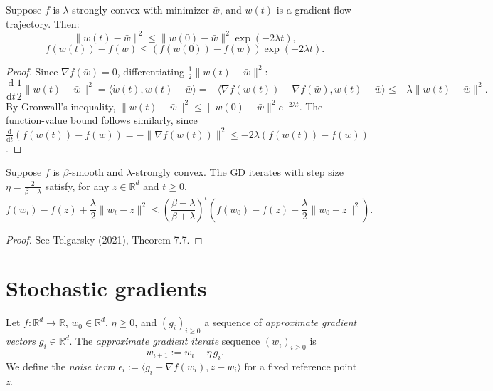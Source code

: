 \begin{theorem}\label{thm:gfStronglyConvex}
Suppose $f$ is $\lambda$-strongly convex with minimizer $\bar{w}$, and $w(t)$ is a gradient flow trajectory.
Then:
\[
  \|w(t) - \bar{w}\|^2 \le \|w(0) - \bar{w}\|^2 \exp(-2\lambda t),
\]
\[
  f(w(t)) - f(\bar{w}) \le (f(w(0)) - f(\bar{w})) \exp(-2\lambda t).
\]
\end{theorem}

\begin{proof}
Since $\nabla f(\bar{w}) = 0$, differentiating $\frac{1}{2}\|w(t) - \bar{w}\|^2$:
\[
  \frac{\mathrm{d}}{\mathrm{d}t}\frac{1}{2}\|w(t) - \bar{w}\|^2
    = \langle \dot{w}(t), w(t) - \bar{w}\rangle
    = -\langle \nabla f(w(t)) - \nabla f(\bar{w}), w(t) - \bar{w}\rangle
    \le -\lambda\|w(t) - \bar{w}\|^2.
\]
By Gronwall's inequality, $\|w(t) - \bar{w}\|^2 \le \|w(0) - \bar{w}\|^2 e^{-2\lambda t}$.
The function-value bound follows similarly, since
$\frac{\mathrm{d}}{\mathrm{d}t}(f(w(t)) - f(\bar{w})) = -\|\nabla f(w(t))\|^2 \le -2\lambda(f(w(t)) - f(\bar{w}))$.
\end{proof}

\begin{theorem}\label{thm:gdStronglyConvexRef}
Suppose $f$ is $\beta$-smooth and $\lambda$-strongly convex.
The GD iterates with step size $\eta = \frac{2}{\beta + \lambda}$ satisfy, for any $z \in \mathbb{R}^d$ and $t \ge 0$,
\[
  f(w_t) - f(z) + \frac{\lambda}{2}\|w_t - z\|^2
  \le \left(\frac{\beta - \lambda}{\beta + \lambda}\right)^t
    \left(f(w_0) - f(z) + \frac{\lambda}{2}\|w_0 - z\|^2\right).
\]
\end{theorem}

\begin{proof}
See Telgarsky (2021), Theorem 7.7.
\end{proof}


\section{Stochastic gradients}
\label{sec:sgd}

\begin{definition}\label{def:approxGDIterate}
  \leanok
Let $f : \mathbb{R}^d \to \mathbb{R}$, $w_0 \in \mathbb{R}^d$, $\eta \ge 0$, and $(g_i)_{i \ge 0}$ a sequence of \emph{approximate gradient vectors} $g_i \in \mathbb{R}^d$.
The \emph{approximate gradient iterate} sequence $(w_i)_{i \ge 0}$ is
\[
  w_{i+1} := w_i - \eta\, g_i.
\]
We define the \emph{noise term} $\epsilon_i := \langle g_i - \nabla f(w_i), z - w_i\rangle$
for a fixed reference point $z$.
\end{definition}

